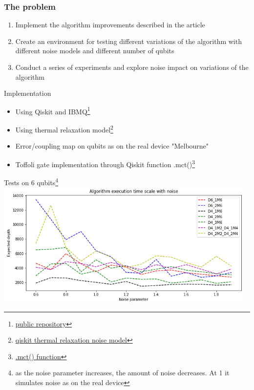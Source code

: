 \documentclass[14pt,aspectratio=169,hyperref={pdftex,unicode},xcolor=dvipsnames]{beamer}
\begin{document}
\begin{frame}
\frametitle{The problem}
\begin{enumerate}
\item Implement the algorithm improvements described in the article
\item Create an environment for testing different variations of the algorithm with different noise models and different number of qubits
\item Conduct a series of experiments and explore noise impact on variations of the algorithm
\end{enumerate}
\end{frame}

\begin{frame}{Implementation}
	\begin{itemize}
		\item Using Qiskit and IBMQ\footnote{\href{https://github.com/StudioShader/QPSA}{public repository}}
		\item Using thermal relaxation  model\footnote{\href{https://github.com/Qiskit/qiskit-tutorials/blob/master/tutorials/simulators/3_building_noise_models.ipynb}{qiskit thermal relaxation noise model}}
		\item Error/coupling map on qubits as on the real device "Melbourne"
		\item Toffoli gate implementation through Qiskit function .mct()\footnote{\href{https://qiskit.org/documentation/stubs/qiskit.circuit.QuantumCircuit.mct.html}{.mct() function}}
	\end{itemize}
\end{frame}

\begin{frame}{Tests on 6 qubits\footnote{as the noise parameter increases, the amount of noise decreases. At 1 it simulates noise as on the real device}}
	\includegraphics[width=13cm]{images/6_qubit_tests_.png}
\end{frame}
\end{document}
